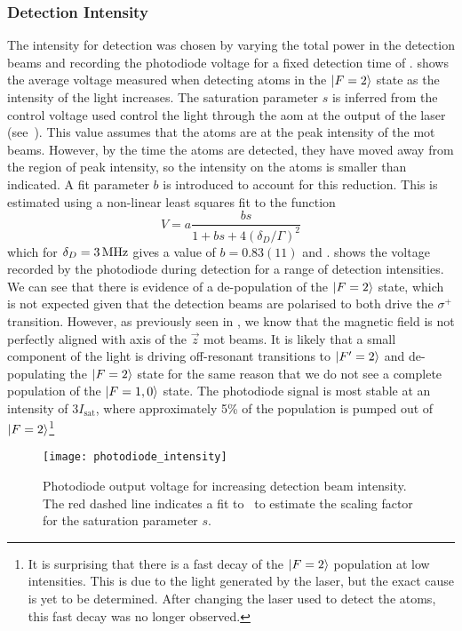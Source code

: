 \subsubsection{Detection Intensity}
The intensity for detection was chosen by varying the total power
in the detection beams and recording the photodiode voltage for a
fixed detection time of .
 shows the average voltage
measured when detecting atoms in the \(\ket{F=2}\) state as the
intensity of the light increases. The saturation parameter \(s\) is
inferred from the control voltage used control the light
through the \ac{aom} at the output of the
\Muquans laser (see~). This value
assumes that the atoms are at the peak
intensity of the \ac{mot} beams. However, by the time the atoms are detected,
they have moved away from the region of peak intensity, so the
intensity on the atoms is smaller than indicated. A fit parameter $b$
is introduced to account for this reduction. This is estimated using a non-linear least squares fit
to the function
\begin{equation}
  V = a\frac{b s}{1 + b s + 4 \left(\delta_D/\Gamma\right)^2}
  \label{eq:voltage_fit}
\end{equation}
which for $\delta_D = \sivalue{3}{\MHz}$ gives a value of \(b =
0.83(11)\)
and .  shows the voltage recorded by the
photodiode during detection for a range of detection intensities.
We can see that there is evidence of a de-population of the
$\ket{F=2}$ state, which is not expected given that the detection
beams are polarised to both drive the $\sigma^+$ transition. However,
as previously seen in
, we know that the magnetic field is not
perfectly aligned with axis of the $\vec{z}$ \ac{mot} beams. It is
likely that a small component of the light is driving off-resonant
transitions to $\ket{F'=2}$ and de-populating the $\ket{F=2}$ state
for the same reason that we do not see a complete population of the
$\ket{F=1,0}$ state.
The photodiode signal is most stable at an intensity of
3\(I_\text{sat}\), where approximately 5\% of the population is
pumped out of \(\ket{F=2}\)\footnote{It is surprising that there is a
  fast decay of the $\ket{F=2}$ population at low intensities. This
  is due to the light generated by the \Muquans laser, but the exact
  cause is yet to be determined. After
  changing the laser used to detect the atoms, this fast decay was no
longer observed.}
\begin{figure}[htpb!]
  \centering
  \texttt{[image: photodiode\_intensity]}
  \caption[Photodiode output voltage for increasing detection beam
  intensity. ]{Photodiode output voltage for increasing detection beam
  intensity. The red dashed line indicates a fit
to~ to estimate the scaling factor for the
saturation parameter \(s\).}
  \label{fig:photodiode_intensity_calib}
\end{figure}

